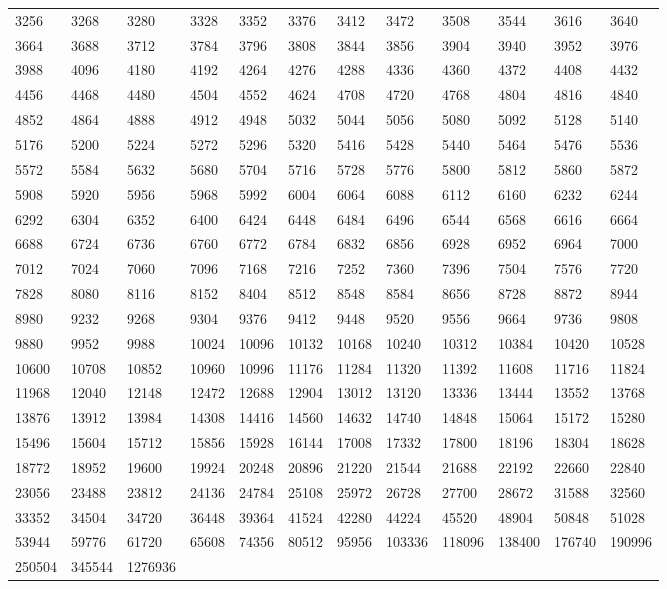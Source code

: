 \begin{longtable}{llllllllllll}
3256 &3268& 3280 &3328 &3352& 3376&3412 &3472& 3508 &3544 &3616& 3640\\
3664 &3688& 3712 &3784 &3796& 3808&3844 &3856& 3904 &3940 &3952& 3976\\
3988 &4096& 4180 &4192 &4264& 4276&4288 &4336& 4360 &4372 &4408& 4432\\
4456 &4468& 4480 &4504 &4552& 4624&4708 &4720& 4768 &4804 &4816& 4840\\
4852 &4864& 4888 &4912 &4948& 5032&5044 &5056& 5080 &5092 &5128& 5140\\
5176 &5200& 5224 &5272 &5296& 5320&5416 &5428& 5440 &5464 &5476& 5536\\
5572 &5584& 5632 &5680 &5704& 5716&5728 &5776& 5800 &5812 &5860& 5872\\
5908 &5920& 5956 &5968 &5992& 6004&6064 &6088& 6112 &6160 &6232& 6244\\
6292 &6304& 6352 &6400 &6424& 6448&6484 &6496& 6544 &6568 &6616& 6664\\
6688 &6724& 6736 &6760 &6772& 6784&6832 &6856& 6928 &6952 &6964& 7000\\
7012 &7024& 7060 &7096 &7168& 7216&7252 &7360& 7396 &7504 &7576& 7720\\
7828 &8080& 8116 &8152 &8404& 8512&8548 &8584& 8656 &8728 &8872& 8944\\
8980 &9232& 9268 &9304 &9376& 9412&9448 &9520& 9556 &9664 &9736& 9808\\
9880 &9952& 9988 &10024 &10096& 10132&10168 &10240& 10312 &10384 &10420& 10528\\
10600 &10708& 10852 &10960 &10996& 11176&11284 &11320& 11392 &11608 &11716& 11824\\
11968 &12040& 12148 &12472 &12688& 12904&13012 &13120& 13336 &13444 &13552& 13768\\
13876 &13912& 13984 &14308 &14416& 14560&14632 &14740& 14848 &15064 &15172& 15280\\
15496 &15604& 15712 &15856 &15928& 16144&17008 &17332& 17800 &18196 &18304& 18628\\
18772 &18952& 19600 &19924 &20248& 20896&21220 &21544& 21688 &22192 &22660& 22840\\
23056 &23488& 23812 &24136 &24784& 25108&25972 &26728& 27700 &28672 &31588& 32560\\
33352 &34504& 34720 &36448 &39364& 41524&42280 &44224& 45520 &48904 &50848& 51028\\
53944 &59776& 61720 &65608 &74356& 80512&95956 &103336& 118096 &138400 &176740& 190996\\
250504 &345544& 1276936 & && & &&  & && \\
\bottomrule\end{longtable}
